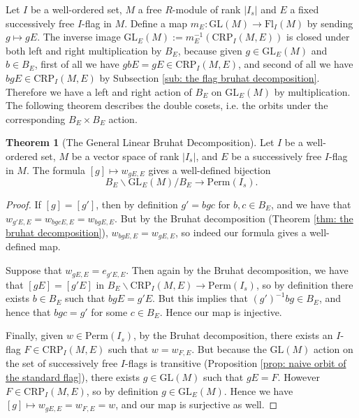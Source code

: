 \documentclass[oneside,11pt]{amsart}
\newcommand{\CRP}{\ensuremath{\text{CRP}}}
\newcommand{\GL}{\ensuremath{\text{GL}}}
\newcommand{\Fl}{\ensuremath{\text{Fl}}}
\newcommand{\Perm}{\ensuremath{\text{Perm}}}
\theoremstyle{definition}
\newtheorem{proof techniques}{Proof Techniques}
\newtheorem{theorem}{Theorem}
\begin{document}
Let $I$ be a well-ordered set, $M$ a free $R$-module of rank $|I_s|$ and $E$ a fixed successively free $I$-flag in $M$. Define a map $m_E : \GL(M) \to \Fl_I(M)$ by sending $g \mapsto gE$. The inverse image $\GL_E(M) := m_E^{-1}( \CRP_I(M , E) )$ is closed under both left and right multiplication by $B_E$, because given $g \in \GL_E(M)$ and $b \in B_E$, first of all we have $g b E = g E \in \CRP_I(M , E)$, and second of all we have $b g E \in \CRP_I(M , E)$ by Subsection \ref{sub: the flag bruhat decomposition}. Therefore we have a left and right action of $B_E$ on $\GL_E(M)$ by multiplication. The following theorem describes the double cosets, i.e. the orbits under the corresponding $B_E \times B_E$ action. 

\begin{theorem}[The General Linear Bruhat Decomposition]\label{thm: the general linear bruhat decomposition}
Let $I$ be a well-ordered set, $M$ be a vector space of rank $|I_s|$, and $E$ be a successively free $I$-flag in $M$. The formula $[g] \mapsto w_{gE , E}$ gives a well-defined bijection 
\begin{equation*}
B_E \backslash \GL_E(M) / B_E \to \Perm(I_s). 
\end{equation*}
\end{theorem}

\begin{proof}
If $[g] = [g']$, then by definition $g' = b g c$ for $b , c \in B_E$, and we have that $w_{g' E , E} = w_{b g c E , E} = w_{b g E , E}$. But by the Bruhat decomposition (Theorem \ref{thm: the bruhat decomposition}), $w_{b g E , E} = w_{ g E , E}$, so indeed our formula gives a well-defined map. 

Suppose that $w_{gE , E} = e_{g' E , E}$. Then again by the Bruhat decomposition, we have that $[gE] = [g'E]$ in $B_E \backslash \CRP_I(M, E) \to \Perm(I_s)$, so by definition there exists $b \in B_E$ such that $bgE = g'E$. But this implies that $(g')^{-1} bg \in B_E$, and hence that $bgc = g'$ for some $c \in B_E$. Hence our map is injective. 

Finally, given $w \in \Perm(I_s)$, by the Bruhat decomposition, there exists an $I$-flag $F \in \CRP_I(M , E)$ such that $w = w_{F , E}$. But because the $\GL(M)$ action on the set of successively free $I$-flags is transitive (Proposition \ref{prop: naive orbit of the standard flag}), there exists $g \in \GL(M)$ such that $gE = F$. However $F \in \CRP_I(M , E)$, so by definition $g \in \GL_E(M)$. Hence we have $[g] \mapsto w_{gE , E} = w_{F , E} = w$, and our map is surjective as well. 
\end{proof}
\end{document}
